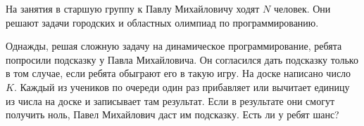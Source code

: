 На занятия в старшую группу к Павлу Михайловичу ходят $N$ человек. Они решают задачи городских и областных олимпиад по программированию.

Однажды, решая сложную задачу на динамическое программирование, ребята попросили подсказку у Павла Михайловича. Он согласился дать подсказку только в том случае, если ребята обыграют его в такую игру. На доске написано число $K$. Каждый из учеников по очереди один раз прибавляет или вычитает единицу из числа на доске и записывает там результат. Если в результате они смогут получить ноль, Павел Михайлович даст им подсказку. Есть ли у ребят шанс?